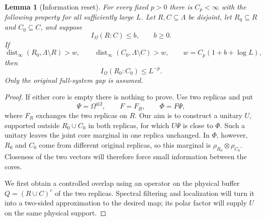 \documentclass[11pt]{article}
\numberwithin{equation}{section}
\newtheorem{lemma}[theorem]{Lemma}
\theoremstyle{definition}
\theoremstyle{remark}
\DeclareMathOperator{\dist}{dist}
\begin{document}
\begin{lemma}[Information reset]
\label{lem:reset}
For every fixed $p>0$ there is $C_p<\infty$ with the following
property for all sufficiently large $L$.  Let $R,C\subseteq\Lambda$
be disjoint, let $R_0\subseteq R$ and $C_0\subseteq C$, and suppose
\[
 I_\Omega(R:C)\le b,\qquad b\ge0.
\]
If
\begin{equation}
 \dist_\infty(R_0,\Lambda\setminus R)>w,\qquad
 \dist_\infty(C_0,\Lambda\setminus C)>w,
 \qquad w=C_p(1+b+\log L),
 \label{eq:info-reset-width}
\end{equation}
then
\[
 I_\Omega(R_0:C_0)\le L^{-p}.
\]
Only the original full-system gap is assumed.
\end{lemma}

\begin{proof}
If either core is empty there is nothing to prove.  Use two replicas
and put
\[
 \Psi=\Omega^{\otimes2},\qquad F=F_R,\qquad \Phi=F\Psi,
\]
where $F_R$ exchanges the two replicas on $R$.  Our aim is to construct
a unitary $U$, supported outside $R_0\cup C_0$ in both replicas, for
which $U\Psi$ is close to $\Phi$.  Such a unitary leaves the joint core marginal in one replica
unchanged.  In $\Phi$, however, $R_0$ and $C_0$ come from different
original replicas, so this marginal is $\rho_{R_0}\otimes\rho_{C_0}$.
Closeness of the two vectors will therefore force small information
between the cores.

We first obtain a controlled overlap using an operator on the physical
buffer $Q=(R\cup C)^c$ of the two replicas.  Spectral filtering and
localization will turn it into a two-sided approximation to the desired
map; its polar factor will supply $U$ on the same physical support.


\end{proof}
\end{document}
